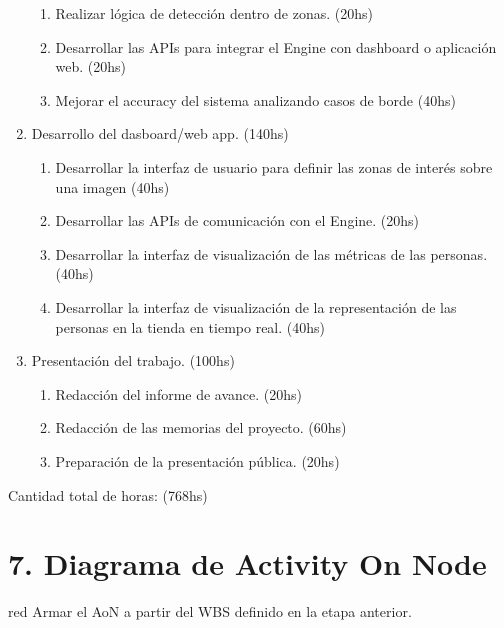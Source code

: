 \documentclass[11pt]{charter}
\begin{document}
\begin{enumerate}
\begin{enumerate}
	\item Realizar lógica de detección dentro de zonas. (20hs)
	\item Desarrollar las APIs para integrar el Engine con dashboard o aplicación web. (20hs)
	\item Mejorar el accuracy del sistema analizando casos de borde (40hs)	
	\end{enumerate}
\item Desarrollo del dasboard/web app. (140hs)
	\begin{enumerate}
	\item Desarrollar la interfaz de usuario para definir las zonas de interés sobre una imagen (40hs)
	\item Desarrollar las APIs de comunicación con el Engine. (20hs)
	\item Desarrollar la interfaz de visualización de las métricas de las personas. (40hs)
	\item Desarrollar la interfaz de visualización de la representación de las personas en la tienda en tiempo real. (40hs)
	\end{enumerate}
\item Presentación del trabajo. (100hs)
	\begin{enumerate}
	\item Redacción del informe de avance. (20hs)
	\item Redacción de las memorias del proyecto. (60hs)
	\item Preparación de la presentación pública. (20hs)
	\end{enumerate}
\end{enumerate}

Cantidad total de horas: (768hs)


\section{7. Diagrama de Activity On Node}
\label{sec:AoN}

\begin{consigna}{red}
Armar el AoN a partir del WBS definido en la etapa anterior. 



\end{consigna}
\end{document}
